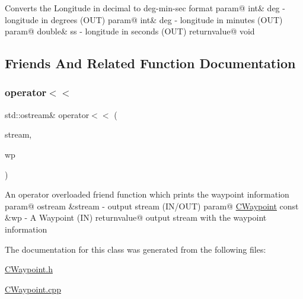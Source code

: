 Converts the Longitude in decimal to deg-\/min-\/sec format param@ int\& deg -\/ longitude in degrees (O\+UT) param@ int\& deg -\/ longitude in minutes (O\+UT) param@ double\& ss -\/ longitude in seconds (O\+UT) returnvalue@ void 

\subsection{Friends And Related Function Documentation}
\mbox{\label{classCWaypoint_a7403a96c1fcf3263e880835cb4590cde}} 
\subsubsection{\texorpdfstring{operator$<$$<$}{operator<<}}
{\footnotesize\ttfamily std\+::ostream\& operator$<$$<$ (\begin{DoxyParamCaption}\item[{std\+::ostream \&}]{stream,  }\item[{\hyperlink{classCWaypoint}{C\+Waypoint} const \&}]{wp }\end{DoxyParamCaption})\hspace{0.3cm}{\ttfamily [friend]}}

An operator overloaded friend function which prints the waypoint information param@ ostream \&stream -\/ output stream (I\+N/\+O\+UT) param@ \hyperlink{classCWaypoint}{C\+Waypoint} const \&wp -\/ A Waypoint (IN) returnvalue@ output stream with the waypoint information 

The documentation for this class was generated from the following files\+:\begin{DoxyCompactItemize}
\item 
\hyperlink{CWaypoint_8h}{C\+Waypoint.\+h}\item 
\hyperlink{CWaypoint_8cpp}{C\+Waypoint.\+cpp}\end{DoxyCompactItemize}
